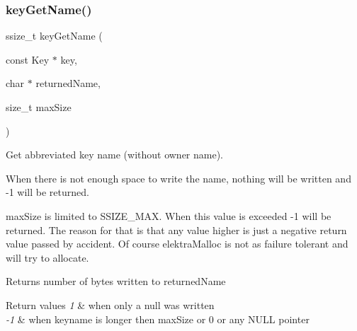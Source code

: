 \subsubsection{\texorpdfstring{keyGetName()}{keyGetName()}}
{\footnotesize\ttfamily ssize\+\_\+t key\+Get\+Name (\begin{DoxyParamCaption}\item[{const Key $\ast$}]{key,  }\item[{char $\ast$}]{returned\+Name,  }\item[{size\+\_\+t}]{max\+Size }\end{DoxyParamCaption})}



Get abbreviated key name (without owner name). 

When there is not enough space to write the name, nothing will be written and -\/1 will be returned.

max\+Size is limited to S\+S\+I\+Z\+E\+\_\+\+M\+AX. When this value is exceeded -\/1 will be returned. The reason for that is that any value higher is just a negative return value passed by accident. Of course elektra\+Malloc is not as failure tolerant and will try to allocate.


\begin{DoxyCode}{0}
\end{DoxyCode}


\begin{DoxyReturn}{Returns}
number of bytes written to {\ttfamily returned\+Name} 
\end{DoxyReturn}

\begin{DoxyRetVals}{Return values}
{\em 1} & when only a null was written \\
\hline
{\em -\/1} & when keyname is longer then max\+Size or 0 or any N\+U\+LL pointer \\
\hline
\end{DoxyRetVals}

